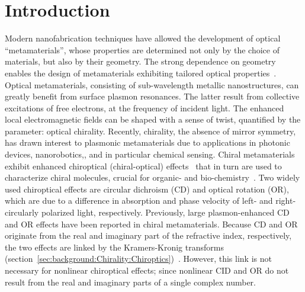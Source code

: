 \section{Introduction}\label{sec:results:OAinPlanarNanohelices:introduction}
Modern nanofabrication techniques have allowed the development of optical ``metamaterials'', whose properties are determined not only by the choice of materials, but also by their geometry. The strong dependence on geometry enables the design of metamaterials exhibiting tailored optical properties~\cite{Pendry2004a, Alu2007, Kauranen2012, Meinzer2014, Moitra2015, Cong2015, Prudencio2016}. 
Optical metamaterials, consisting of sub-wavelength metallic nanostructures, can greatly benefit from surface plasmon resonances. The latter result from collective excitations of free electrons, at the frequency of incident light. The enhanced local electromagnetic fields can be shaped with a sense of twist, quantified by the parameter: optical chirality.\cite{Tang2010, Schaferling2012}
Recently, chirality, the absence of mirror symmetry, has drawn interest to plasmonic metamaterials due to applications in photonic devices,\cite{Rizza2015, Esposito2016, Hou2016} nanorobotics,\cite{Urban2015, Schamel2013a}, and in particular chemical sensing.
Chiral metamaterials exhibit enhanced chiroptical (chiral-optical) effects~\cite{Schaferling2014, Karimullah2015, Canaguier-Durand2014} that in turn are used to characterize chiral molecules, crucial for organic- and bio-chemistry~\cite{Zhao2017, Hendry2010, Tullius2015}.
Two widely used chiroptical effects are circular dichroism (CD) and optical rotation (OR), which are due to a difference in absorption and phase velocity of left- and right- circularly polarized light, respectively. Previously, large plasmon-enhanced CD and OR effects have been reported in chiral metamaterials.\cite{Papakostas2003, Kuwata-Gonokami2005a, Decker2007, Plum2007, Gansel2011}
Because CD and OR originate from the real and imaginary part of the refractive index, respectively, the two effects are linked by the Kramers-Kronig transforms (section~\ref{sec:background:Chirality:Chiroptics})~\cite{Barron2004, Parson2007, Govorov2011}.
However, this link is not necessary for nonlinear chiroptical effects; since nonlinear CID and OR do not result from the real and imaginary parts of a single complex number.

